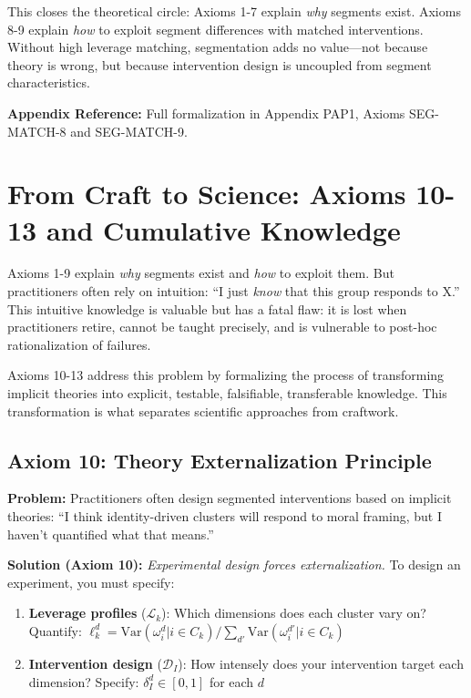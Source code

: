 This closes the theoretical circle: Axioms 1-7 explain \emph{why} segments exist.
Axioms 8-9 explain \emph{how} to exploit segment differences with matched interventions.
Without high leverage matching, segmentation adds no value---not because theory is wrong,
but because intervention design is uncoupled from segment characteristics.

\textbf{Appendix Reference:} Full formalization in Appendix PAP1, Axioms SEG-MATCH-8 and SEG-MATCH-9.

\section{From Craft to Science: Axioms 10-13 and Cumulative Knowledge}
\label{sec:axioms-10-13}

Axioms 1-9 explain \emph{why} segments exist and \emph{how} to exploit them. But practitioners often rely on intuition: ``I just \textit{know} that this group responds to X.'' This intuitive knowledge is valuable but has a fatal flaw: it is lost when practitioners retire, cannot be taught precisely, and is vulnerable to post-hoc rationalization of failures.

Axioms 10-13 address this problem by formalizing the process of transforming implicit theories into explicit, testable, falsifiable, transferable knowledge. This transformation is what separates scientific approaches from craftwork.

\subsection{Axiom 10: Theory Externalization Principle}

\textbf{Problem:} Practitioners often design segmented interventions based on implicit theories: ``I think identity-driven clusters will respond to moral framing, but I haven't quantified what that means.''

\textbf{Solution (Axiom 10):} \emph{Experimental design forces externalization.} To design an experiment, you must specify:

\begin{enumerate}[nosep]
\item \textbf{Leverage profiles} ($\mathcal{L}_k$): Which dimensions does each cluster vary on? Quantify: $\ell_k^d = \text{Var}(\omega_i^d | i \in C_k) / \sum_{d'} \text{Var}(\omega_i^{d'} | i \in C_k)$
\item \textbf{Intervention design} ($\mathcal{D}_I$): How intensely does your intervention target each dimension? Specify: $\delta_I^d \in [0,1]$ for each $d$
\end{enumerate}

